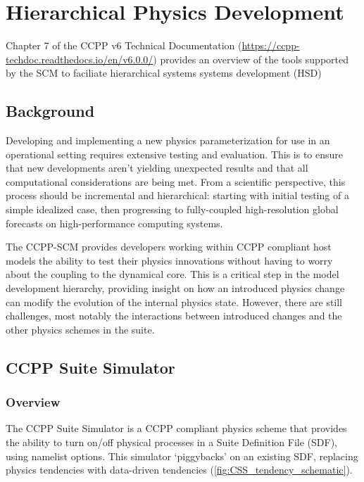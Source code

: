 \chapter{Hierarchical Physics Development}
\label{chapter: Hierarchical_Physics_Development}

Chapter 7 of the CCPP v6 Technical Documentation (\url{https://ccpp-techdoc.readthedocs.io/en/v6.0.0/}) provides an overview of the tools supported by the SCM to faciliate hierarchical systems systems development (HSD)

\section{Background}

Developing and implementing a new physics parameterization for use in an operational setting requires extensive testing and evaluation. This is to ensure that new developments aren’t yielding unexpected results and that all computational considerations are being met. From a scientific perspective, this process should be incremental and hierarchical: starting with initial testing of a simple idealized case, then progressing to fully-coupled high-resolution global forecasts on high-performance computing systems.


The CCPP-SCM provides developers working within CCPP compliant host models the ability to test their physics innovations without having to worry about the coupling to the dynamical core. This is a critical step in the model development hierarchy, providing insight on how an introduced physics change can modify the evolution of the internal physics state. However, there are still challenges, most notably the interactions between introduced changes and the other physics schemes in the suite.

\section{CCPP Suite Simulator}

\subsection{Overview}

The CCPP Suite Simulator is a CCPP compliant physics scheme that provides the ability to turn on/off physical processes in a Suite Definition File (SDF), using namelist options. This simulator `piggybacks' on an existing SDF, replacing physics tendencies with data-driven tendencies (\ref{fig:CSS_tendency_schematic}). 


